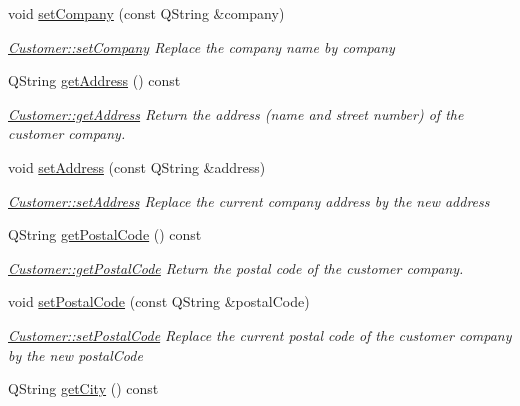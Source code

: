 \begin{DoxyCompactItemize}
void \hyperlink{classModels_1_1Customer_ab4faf3a76242bc4c3ac44bafd628a4c6}{set\+Company} (const Q\+String \&company)
\begin{DoxyCompactList}\small\item\em \hyperlink{classModels_1_1Customer_ab4faf3a76242bc4c3ac44bafd628a4c6}{Customer\+::set\+Company} Replace the company name by {\itshape company} \end{DoxyCompactList}\item 
Q\+String \hyperlink{classModels_1_1Customer_a594e1458ca9f3a449f2628c861bc3a40}{get\+Address} () const 
\begin{DoxyCompactList}\small\item\em \hyperlink{classModels_1_1Customer_a594e1458ca9f3a449f2628c861bc3a40}{Customer\+::get\+Address} Return the address (name and street number) of the customer company. \end{DoxyCompactList}\item 
void \hyperlink{classModels_1_1Customer_ae2d41b145d9c468f7e3c40a38882873d}{set\+Address} (const Q\+String \&address)
\begin{DoxyCompactList}\small\item\em \hyperlink{classModels_1_1Customer_ae2d41b145d9c468f7e3c40a38882873d}{Customer\+::set\+Address} Replace the current company address by the new {\itshape address} \end{DoxyCompactList}\item 
Q\+String \hyperlink{classModels_1_1Customer_ad544bdcd4d021f92bd77e5aa24f31f21}{get\+Postal\+Code} () const 
\begin{DoxyCompactList}\small\item\em \hyperlink{classModels_1_1Customer_ad544bdcd4d021f92bd77e5aa24f31f21}{Customer\+::get\+Postal\+Code} Return the postal code of the customer company. \end{DoxyCompactList}\item 
void \hyperlink{classModels_1_1Customer_a2bd4ac52294de78236e159caaa29412b}{set\+Postal\+Code} (const Q\+String \&postal\+Code)
\begin{DoxyCompactList}\small\item\em \hyperlink{classModels_1_1Customer_a2bd4ac52294de78236e159caaa29412b}{Customer\+::set\+Postal\+Code} Replace the current postal code of the customer company by the new {\itshape postal\+Code} \end{DoxyCompactList}\item 
Q\+String \hyperlink{classModels_1_1Customer_ace3f86c1e5108ede84a1a09516b37e50}{get\+City} () const 

\end{DoxyCompactItemize}
